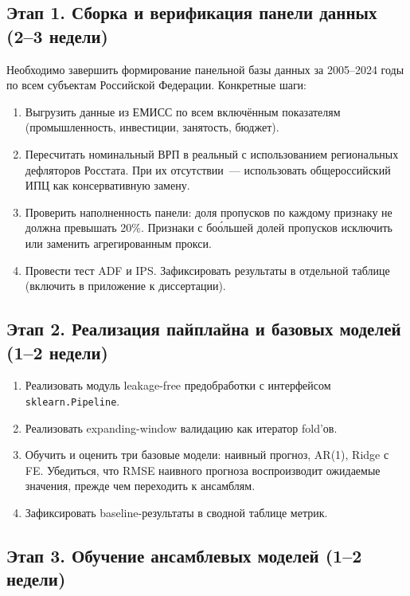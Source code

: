 \documentclass[12pt,a4paper]{article}
\begin{document}
\subsection*{Этап 1. Сборка и верификация панели данных (2--3 недели)}

Необходимо завершить формирование панельной базы данных за 2005--2024 годы
по всем субъектам Российской Федерации. Конкретные шаги:
\begin{enumerate}
  \item Выгрузить данные из ЕМИСС по всем включённым показателям
        (промышленность, инвестиции, занятость, бюджет).
  \item Пересчитать номинальный ВРП в реальный с использованием
        региональных дефляторов Росстата. При их отсутствии~---
        использовать общероссийский ИПЦ как консервативную замену.
  \item Проверить наполненность панели: доля пропусков по каждому признаку
        не должна превышать 20\%. Признаки с бо\'{о}льшей долей пропусков
        исключить или заменить агрегированным прокси.
  \item Провести тест ADF и IPS. Зафиксировать результаты в отдельной
        таблице (включить в приложение к диссертации).
\end{enumerate}

\subsection*{Этап 2. Реализация пайплайна и базовых моделей (1--2 недели)}

\begin{enumerate}
  \item Реализовать модуль leakage-free предобработки с интерфейсом
        \texttt{sklearn.Pipeline}.
  \item Реализовать expanding-window валидацию как итератор fold'ов.
  \item Обучить и оценить три базовые модели: наивный прогноз, AR(1),
        Ridge с FE. Убедиться, что RMSE наивного прогноза воспроизводит
        ожидаемые значения, прежде чем переходить к ансамблям.
  \item Зафиксировать baseline-результаты в сводной таблице метрик.
\end{enumerate}

\subsection*{Этап 3. Обучение ансамблевых моделей (1--2 недели)}
\end{document}
